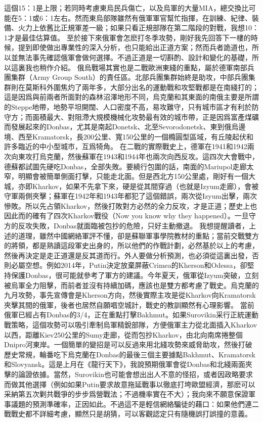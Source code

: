 \documentclass[twocolumn]{ctexart}
\begin{document}
這個15：1是上限；若同時考慮東烏民兵傷亡，以及烏軍的大量MIA，總交換比可能在5：1或6：1左右。然而東烏部隊雖然有俄軍軍官幫忙指揮，在訓練、紀律、裝備、火力上依舊比正規軍差一級；如果只看正規部隊在第二階段的對戰，我想10：1才是最佳估算值。
至於接下來俄軍會怎麽打冬季攻勢，剛好我先回答下一樓的時候，提到即使做出專業性的深入分析，也只能給出正道方案；然而兵者詭道也，所以並無法事先確認俄軍會做何選擇。不過正道是一切斟酌、設計和變化的基礎，所以這裏我也稍作介紹。
俄烏戰場其實也是二戰歐洲東綫的重點，屬於德軍南部兵團集群（Army Group South）的責任區。北部兵團集群始終是助攻，中部兵團集群則在莫斯科外圍焦灼了兩年多，大部分出名的運動戰和攻堅戰都是在南綫打的；這是因爲與前兩者所面對的森林沼澤地形不同，烏克蘭和其東面的南俄主要是所謂的Steppe地帶，地勢平坦開闊、人口密度不高，易攻難守，只有城市區才有利於防守方；而面積最大、對阻滯大規模機械化攻勢最有效的城市帶，正是因爲富產煤礦而發展起來的Donbas，尤其是南起Donetsk、北至Sevorodonetsk、東到俄烏邊境、西至Kramatorsk，長200公里、寬150公里的一個橢圓型區域，有丘陵起伏和許多臨近的中小型城市，互爲犄角。
在二戰的實際戰史上，德軍在1941和1942兩次向東攻打烏克蘭，然後蘇軍在1943和1944年也兩次向西反攻。這四次大會戰中，德蘇都試圖先硬吃Donbas，全部失敗。要繞行包圍的話，南面的Mariupol走廊太窄，明顯會被簡單側面打擊，只能走北面。但是西北方150公里處，剛好有一個大城，亦即Kharkov，如果不先拿下來，硬是從其間穿過（也就是Izyum走廊），會被守軍兩側夾擊；蘇軍在1942年和1943年都犯了這個錯誤，兩次從Izyum出擊，兩次慘敗。所以先占領Kharkov，然後打敗對方必然的全力反攻，才是正道；歷史上也因此而的確有了四次Kharkov戰役（Now you know why they happened）。一旦守方的反攻失敗，Donbas就面臨被包抄的危險，只好主動撤退。
我想提醒讀者，上述的道理，雖然中國網絡軍評不懂，卻是蘇聯軍事學院教材的重點；當前交戰雙方的將領，都是熟讀這段軍史出身的，所以他們的作戰計劃，必然基於以上的考慮，然後再決定是走正道還是反其道而行。外人要做分析預測，也必須從這裏出發，否則必屬空想。例如2014年，Putin決定放棄屏蔽Crimea的Kherson和Odessa，卻堅持保護Donbas，很可能就參考了軍方的建議。今年夏天，俄軍從Izyum突破，立刻被烏軍全力阻擊，而前者並沒有持續加碼，應該也是雙方都考慮了戰史。烏克蘭的九月攻勢，事先宣傳會是Kherson方向，然後實際主攻是從Kharkov向Kramatorsk夾擊其間的俄軍，後者也居然自願唱空城計，戰史的教訓顯然有心理影響。
當前俄軍已經占有Donbas的3/4，正在重點打擊Bakhmut。如果Surovikin采行正統運動戰策略，這個攻勢可以吸引牽制烏軍精銳部隊，方便俄軍主力從北面插入Kharkov以西，距離Kiev250公里的Sumy走廊，從而包抄Kharkov，由北向南席捲整個Dnipro河東岸。一個簡單的變招是可以反過來用北綫攻勢來威脅助攻，然後打破歷史常規，輪番吃下烏克蘭在Donbas的最後三個主要據點Bakhmut、Kramatorsk和Slovyansk。這是上月在《龍行天下》，我說預期俄軍會從Donbas和北綫兩面夾擊的論證依據。當然，Surovikin也可能會想出出人不意的怪招，或者因政略要求而做其他選擇（例如如果Putin要求故意拖延戰事以徹底打垮歐盟經濟，那麽可以采納第五次剿共戰爭的步步爲營戰法；不過機率實在不大）；我向來不願意保證軍事議題的預測準確率，正因如此。不過這不是輕信網絡騙徒的藉口：如果他們連二戰戰史都不詳細考慮，顯然只是胡猜，可以客觀認定只有隨機誤打誤撞的意義。
\end{document}
